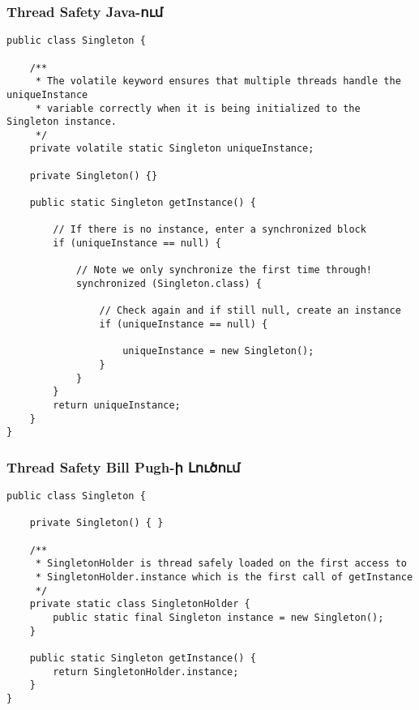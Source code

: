 \documentclass{beamer}
\begin{document}
\begin{frame}[fragile]\frametitle{Thread Safety Java-ում}
\begin{english}
\begin{verbatim}
public class Singleton {

    /**
     * The volatile keyword ensures that multiple threads handle the uniqueInstance
     * variable correctly when it is being initialized to the Singleton instance.
     */
    private volatile static Singleton uniqueInstance;

    private Singleton() {}

    public static Singleton getInstance() {

        // If there is no instance, enter a synchronized block
        if (uniqueInstance == null) {

            // Note we only synchronize the first time through!
            synchronized (Singleton.class) {

                // Check again and if still null, create an instance
                if (uniqueInstance == null) {

                    uniqueInstance = new Singleton();
                }
            }
        }
        return uniqueInstance;
    }
}
\end{verbatim}
\end{english}
\end{frame}

\begin{frame}[fragile]\frametitle{Thread Safety Bill Pugh-ի Լուծում}
\begin{english}
\begin{verbatim}
public class Singleton {

    private Singleton() { }

    /**
     * SingletonHolder is thread safely loaded on the first access to
     * SingletonHolder.instance which is the first call of getInstance
     */
    private static class SingletonHolder {
        public static final Singleton instance = new Singleton();
    }

    public static Singleton getInstance() {
        return SingletonHolder.instance;
    }
}
\end{verbatim}
\end{english}
\end{frame}
\end{document}
